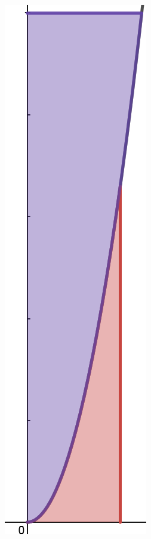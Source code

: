 \documentclass[a4paper,12pt]{article}
\begin{document}
\begin{enumerate}
    \begin{center}
        \includegraphics[scale=0.4]{Figur 6.png}
    \end{center}

\end{enumerate}
\end{document}
